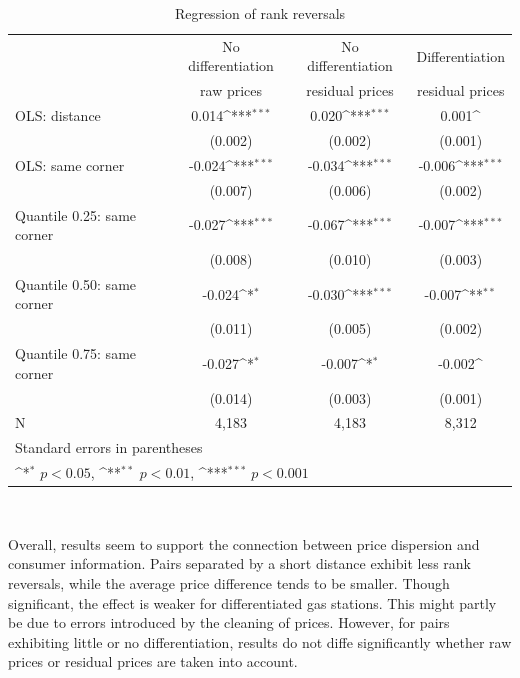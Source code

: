 \documentclass[11pt]{article}
\begin{document}
\begin{table}[h]
\centering
\def\sym#1{\ifmmode^{#1}\else\(^{#1}\)\fi}
\caption{Regression of rank reversals}
\begin{tabular}{lccc}
\hline
\hline
{} & No differentiation & No differentiation & Differentiation \\
{} & raw prices & residual prices & residual prices \\
\hline
OLS: distance             &  0.014\sym{***}  &  0.020\sym{***}  &  0.001\sym{}\\
{}                        & (0.002)          & (0.002)          & (0.001)   \\
OLS: same corner                & -0.024\sym{***}  & -0.034\sym{***}  & -0.006\sym{***}\\
{}                        & (0.007)          & (0.006)          & (0.002) \\
Quantile 0.25: same corner      & -0.027\sym{***}  & -0.067\sym{***}  & -0.007\sym{***}\\
{}                        & (0.008)          & (0.010)          & (0.003)  \\
Quantile 0.50: same corner      & -0.024\sym{*}    & -0.030\sym{***}  & -0.007\sym{**}\\
{}                        & (0.011)          & (0.005)          & (0.002)    \\
Quantile 0.75: same corner      & -0.027\sym{*}    & -0.007\sym{*}    & -0.002\sym{}\\
{}                        & (0.014)          & (0.003)          & (0.001)   \\
\hline
N                         & 4,183            &   4,183          &     8,312    \\
\hline\hline
\multicolumn{4}{l}{\footnotesize Standard errors in parentheses}\\
\multicolumn{4}{l}{\footnotesize \sym{*} \(p<0.05\), \sym{**} \(p<0.01\), \sym{***} \(p<0.001\)}\\
\end{tabular}
\\
\end{table}

Overall, results seem to support the connection between price dispersion and consumer information. Pairs separated by a short distance exhibit less rank reversals, while the average price difference tends to be smaller. Though significant, the effect is weaker for differentiated gas stations. This might partly be due to errors introduced by the cleaning of prices. However, for pairs exhibiting little or no differentiation, results do not diffe significantly whether raw prices or residual prices are taken into account.
\end{document}
